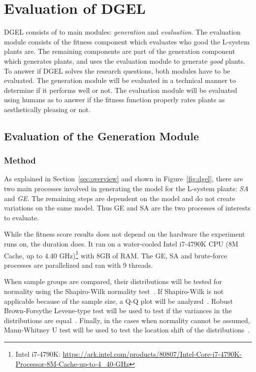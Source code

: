 \chapter{Evaluation of DGEL}
DGEL consists of to main modules: \textit{generation} and \textit{evaluation}.
The evaluation module consists of the fitness component which evaluates who good the L-system plants are.
The remaining components are part of the generation component which generates plants, and uses the evaluation module to generate \textit{good} plants.
To answer if DGEL solves the research questions, both modules have to be evaluated.
The generation module will be evaluated in a technical manner to determine if it performs well or not.
The evaluation module will be evaluated using humans as to answer if the fitness function properly rates plants as aesthetically pleasing or not.

\section{Evaluation of the Generation Module}
\subsection{Method}
As explained in Section~\ref{sec:overview} and shown in Figure~\ref{fig:dgel}, there are two main processes involved in generating the model for the L-system plants: \textit{SA} and \textit{GE}.
The remaining steps are dependent on the model and do not create variations on the same model.
Thus GE and SA are the two processes of interests to evaluate.

While the fitness score results does not depend on the hardware the experiment runs on, the duration does.
It ran on a water-cooled Intel i7-4790K CPU (8M Cache, up to 4.40 GHz)\footnote{Intel i7-4790K: \url{https://ark.intel.com/products/80807/Intel-Core-i7-4790K-Processor-8M-Cache-up-to-4_40-GHz}} with 8GB of RAM.
The GE, SA and brute-force processes are parallelized and ran with 9 threads.

When sample groups are compared, their distributions will be tested for normality using the Shapiro-Wilk normality test~\cite{1965Shapiro}.
If Shapiro-Wilk is not applicable because of the sample size, a Q-Q plot will be analyzed~\cite{1968Wilk}.
Robust Brown-Forsythe Levene-type test will be used to test if the variances in the distributions are equal~\cite{1974Brown}.
Finally, in the cases when normality cannot be assumed, Mann-Whitney U test will be used to test the location shift of the distributions~\cite{1947Mann}.

